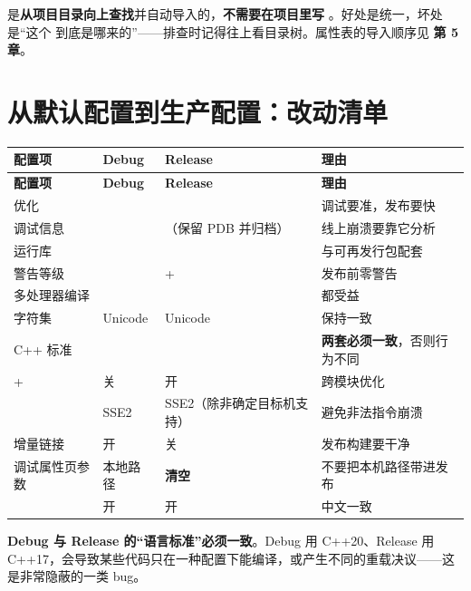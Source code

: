 {{\begin{warnbox}[注意]
 是\textbf{从项目目录向上查找}并自动导入的，\textbf{不需要在项目里写 }。好处是统一，坏处是“这个  到底是哪来的”——排查时记得往上看目录树。属性表的导入顺序见 \textbf{第 5 章}。
\end{warnbox}

\section{从默认配置到生产配置：改动清单}

\begin{longtable}{L{3.4cm}L{3.0cm}L{3.4cm}L{4.4cm}}
\toprule
\textbf{配置项} & \textbf{Debug} & \textbf{Release} & \textbf{理由} \\
\midrule
\endfirsthead
\toprule
\textbf{配置项} & \textbf{Debug} & \textbf{Release} & \textbf{理由} \\
\midrule
\endhead
\bottomrule
\endlastfoot
优化 &  &  & 调试要准，发布要快 \\
调试信息 &  & （保留 PDB 并归档） & 线上崩溃要靠它分析 \\
运行库 &  &  & 与可再发行包配套 \\
警告等级 &  &  + \textbf{} & 发布前零警告 \\
多处理器编译 &  &  & 都受益 \\
字符集 & Unicode & Unicode & 保持一致 \\
C++ 标准 &  &  & \textbf{两套必须一致}，否则行为不同 \\
 +  & 关 & 开 & 跨模块优化 \\
 & SSE2 & SSE2（除非确定目标机支持） & 避免非法指令崩溃 \\
增量链接 & 开 & 关 & 发布构建要干净 \\
调试属性页参数 & 本地路径 & \textbf{清空} & 不要把本机路径带进发布 \\
 & 开 & 开 & 中文一致 \\
\end{longtable}

\begin{warnbox}[注意]
\textbf{Debug 与 Release 的“语言标准”必须一致}。Debug 用 C++20、Release 用 C++17，会导致某些代码只在一种配置下能编译，或产生不同的重载决议——这是非常隐蔽的一类 bug。
\end{warnbox}

}}
